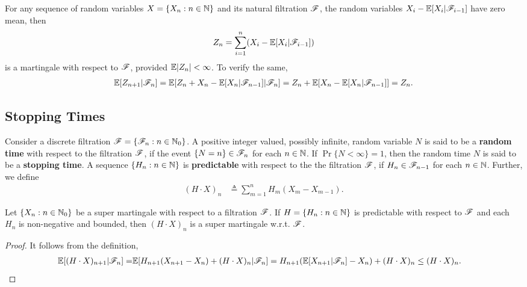 \documentclass[a4paper,10pt,english]{article}
\begin{document}
\begin{shaded*}
\begin{exmp*}
For any sequence of random variables $X = \{X_n: n \in \mathbb{N}\}$ and its natural filtration $\mathscr{F}$, 
the random variables $X_i-\mathbb{E}[X_i|\mathscr{F}_{i-1}]$ have zero mean, then 
\begin{align*}
Z_n =\sum_{i=1}^n (X_i -\mathbb{E}[X_i|\mathscr{F}_{i-1}])
\end{align*}
is a martingale with respect to $\mathscr{F}$, provided $\mathbb{E} |Z_n|< \infty$.  
To verify the same, 
\begin{align*}
\mathbb{E}[Z_{n+1}|\mathscr{F}_n]&= \mathbb{E}[Z_n+X_n-\mathbb{E}[X_n|\mathscr{F}_{n-1}]|\mathscr{F}_n] = Z_n+\mathbb{E}[X_n-\mathbb{E}[X_n|\mathscr{F}_{n-1}]]=Z_n.\\
\end{align*}
\end{exmp*}
\end{shaded*}
\subsection{Stopping Times}
Consider a discrete filtration $\mathscr{F} = \{\mathscr{F}_n: n \in \mathbb{N}_0\}$.  
A positive integer valued, possibly infinite, random variable $N$ is said to be a \textbf{random time} with respect to the 
filtration $\mathscr{F}$,  if the event $\{N=n\} \in \mathscr{F}_n$ for each $n \in \mathbb{N}$. 
If $\Pr\{N < \infty\}=1$, then the random time $N$ is said to be a \textbf{stopping time}. 
A sequence $\{H_n: n\in \mathbb{N}\}$ is \textbf{predictable} with respect to the the filtration $\mathscr{F}$, if $H_n \in \mathscr{F}_{n-1}$ for each $n \in \mathbb{N}$. 
Further, we define 
\begin{align*}
(H\cdot X)_n &\triangleq \sum_{m=1}^{n}H_m(X_m-X_{m-1}).
\end{align*}
\begin{thm}
Let $\{X_n: n \in \mathbb{N}_0\}$ be a super martingale with respect to a filtration $\mathscr{F}$. 
If $H = \{H_n: n \in \mathbb{N}\}$ is predictable with respect to $\mathscr{F}$ and each $H_n$ is non-negative and bounded, 
then $(H \cdot X)_n$ is a super martingale w.r.t. $\mathscr{F}$. 
\end{thm}
\begin{proof}
It follows from the definition, 
\begin{align*}
\mathbb{E}[(H\cdot X)_{n+1}|\mathscr{F}_n]=&\mathbb{E}[H_{n+1}(X_{n+1}-X_n)+(H\cdot X)_n|\mathscr{F}_n] = H_{n+1}(\mathbb{E}[X_{n+1}|\mathscr{F}_n]-X_n)+(H\cdot X)_n \leq (H\cdot X)_n.
\end{align*}
\end{proof}
\end{document}
